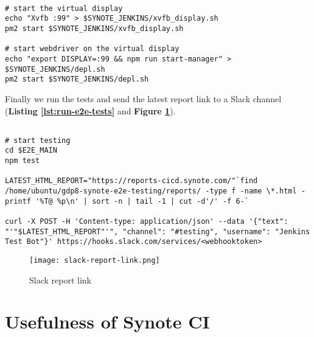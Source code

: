 \begin{listing}[H]
\begin{verbatim}

# start the virtual display
echo "Xvfb :99" > $SYNOTE_JENKINS/xvfb_display.sh
pm2 start $SYNOTE_JENKINS/xvfb_display.sh

# start webdriver on the virtual display
echo "export DISPLAY=:99 && npm run start-manager" > $SYNOTE_JENKINS/depl.sh
pm2 start $SYNOTE_JENKINS/depl.sh

\end{verbatim}
\label{lst:webdriver-pm2}
\end{listing}

Finally we run the tests and send the latest report link to a Slack channel (\textbf{Listing \ref{lst:run-e2e-tests}} and \textbf{Figure \ref{fig:slack-report-link}}).

\begin{listing}[H]
\begin{verbatim}

# start testing
cd $E2E_MAIN
npm test

LATEST_HTML_REPORT="https://reports-cicd.synote.com/"`find /home/ubuntu/gdp8-synote-e2e-testing/reports/ -type f -name \*.html -printf '%T@ %p\n' | sort -n | tail -1 | cut -d'/' -f 6-`

curl -X POST -H 'Content-type: application/json' --data '{"text": "'"$LATEST_HTML_REPORT"'", "channel": "#testing", "username": "Jenkins Test Bot"}' https://hooks.slack.com/services/<webhooktoken>

\end{verbatim}
\label{lst:run-e2e-tests}
\end{listing}

\begin{figure}[!hbt]
  	\centering
 	\texttt{[image: slack-report-link.png]}
  	\caption{Slack report link}
 	\label{fig:slack-report-link}
\end{figure}

\section{Usefulness of Synote CI}
\label{sec:usefulness-of-synote-ci}

